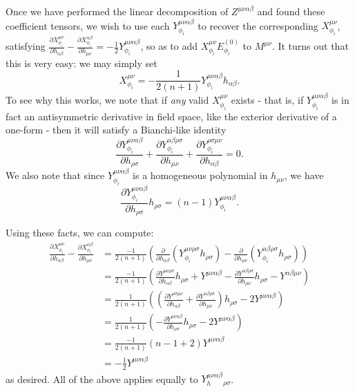 \documentclass[aps,physrev,preprint,groupedaddress]{revtex4-2}
\begin{document}
Once we have performed the linear decomposition of \(Z^{\mu\nu\alpha\beta}\) and found these coefficient tensors, we wish to use each \(Y_{\phi_i}^{\mu\nu\alpha\beta}\) to recover the corresponding \(X_{\phi_i}^{\mu\nu}\), satisfying \(\frac{\partial X_{\phi_i}^{\mu\nu}}{\partial h_{\alpha\beta}}-\frac{\partial X_{\phi_i}^{\alpha\beta}}{\partial h_{\mu\nu}}=-\frac{1}{2}Y_{\phi_i}^{\mu\nu\alpha\beta}\), so as to add \(X_{\phi_i}^{\mu\nu}E_{\phi_i}^{(0)}\) to \(M^{\mu\nu}\). It turns out that this is very easy: we may simply set
\begin{equation}
X_{\phi_i}^{\mu\nu}=-\frac{1}{2(n+1)}Y_{\phi_i}^{\mu\nu\alpha\beta}h_{\alpha\beta}.
\end{equation}
To see why this works, we note that if \textit{any} valid \(X_{\phi_i}^{\mu\nu}\) exists - that is, if \(Y_{\phi_i}^{\mu\nu\alpha\beta}\) is in fact an antisymmetric derivative in field space, like the exterior derivative of a one-form - then it will satisfy a Bianchi-like identity
\begin{equation}
\frac{\partial Y_{\phi_i}^{\mu\nu\alpha\beta}}{\partial h_{\rho\sigma}}+\frac{\partial Y_{\phi_i}^{\alpha\beta\rho\sigma}}{\partial h_{\mu\nu}}+\frac{\partial Y_{\phi_i}^{\rho\sigma\mu\nu}}{\partial h_{\alpha\beta}}=0.
\end{equation}
We also note that since \(Y_{\phi_i}^{\mu\nu\alpha\beta}\) is a homogeneous polynomial in \(h_{\mu\nu}\), we have
\begin{equation}
\frac{\partial Y_{\phi_i}^{\mu\nu\alpha\beta}}{\partial h_{\rho\sigma}}h_{\rho\sigma}=(n-1)Y_{\phi_i}^{\mu\nu\alpha\beta}.
\end{equation}

Using these facts, we can compute:
\begin{equation}\begin{split}
\frac{\partial X_{\phi_i}^{\mu\nu}}{\partial h_{\alpha\beta}}-\frac{\partial X_{\phi_i}^{\alpha\beta}}{\partial h_{\mu\nu}}&=\frac{-1}{2(n+1)}\left(\frac{\partial}{\partial h_{\alpha\beta}}\left(Y_{\phi_i}^{\mu\nu\rho\sigma}h_{\rho\sigma}\right)-\frac{\partial}{\partial h_{\mu\nu}}\left(Y_{\phi_i}^{\alpha\beta\rho\sigma}h_{\rho\sigma}\right)\right)\\
&=\frac{-1}{2(n+1)}\left(\frac{\partial Y^{\mu\nu\rho\sigma}}{\partial h_{\alpha\beta}}h_{\rho\sigma}+Y^{\mu\nu\alpha\beta}-\frac{\partial Y^{\alpha\beta\rho\sigma}}{\partial h_{\mu\nu}}h_{\rho\sigma}-Y^{\alpha\beta\mu\nu}\right)\\
&=\frac{1}{2(n+1)}\left(\left(\frac{\partial Y^{\rho\sigma\mu\nu}}{\partial h_{\alpha\beta}}+\frac{\partial Y^{\alpha\beta\rho\sigma}}{\partial h_{\mu\nu}}\right)h_{\rho\sigma}-2Y^{\mu\nu\alpha\beta}\right)\\
&=\frac{1}{2(n+1)}\left(-\frac{\partial Y^{\mu\nu\alpha\beta}}{\partial h_{\rho\sigma}}h_{\rho\sigma}-2Y^{\mu\nu\alpha\beta}\right)\\
&=\frac{-1}{2(n+1)}(n-1+2)Y^{\mu\nu\alpha\beta}\\
&=-\frac{1}{2}Y^{\mu\nu\alpha\beta}
\end{split}\end{equation}
as desired. All of the above applies equally to \(Y_h^{\mu\nu\alpha\beta}{}_{\rho\sigma}\). 
\end{document}
